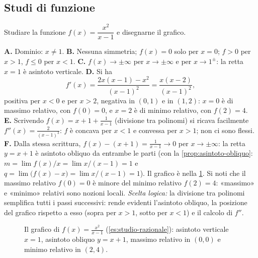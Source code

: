 \subsection*{Studi di funzione}

\begin{esercizio}\label{es:studio-razionale}
Studiare la funzione $f(x)=\dfrac{x^{2}}{x-1}$ e disegnarne il grafico.
\begin{soluzione}
\textbf{A.} Dominio: $x\neq1$. \textbf{B.} Nessuna simmetria; $f(x)=0$ solo per $x=0$;
$f>0$ per $x>1$, $f\le0$ per $x<1$. \textbf{C.} $f(x)\to\pm\infty$ per $x\to\pm\infty$ e
per $x\to1^{\pm}$: la retta $x=1$ è asintoto verticale. \textbf{D.} Si ha
\[
  f'(x)=\frac{2x(x-1)-x^{2}}{(x-1)^{2}}=\frac{x(x-2)}{(x-1)^{2}} ,
\]
positiva per $x<0$ e per $x>2$, negativa in $(0,1)$ e in $(1,2)$: $x=0$ è di massimo
relativo, con $f(0)=0$, e $x=2$ è di minimo relativo, con $f(2)=4$. \textbf{E.}
Scrivendo $f(x)=x+1+\frac1{x-1}$ (divisione tra polinomi) si ricava facilmente
$f''(x)=\frac{2}{(x-1)^{3}}$: $f$ è concava per $x<1$ e convessa per $x>1$; non ci sono
flessi. \textbf{F.} Dalla stessa scrittura, $f(x)-(x+1)=\frac1{x-1}\to0$ per
$x\to\pm\infty$: la retta $y=x+1$ è asintoto obliquo da entrambe le parti (con la
\cref{prop:asintoto-obliquo}: $m=\lim f(x)/x=\lim x/(x-1)=1$ e
$q=\lim\bigl(f(x)-x\bigr)=\lim x/(x-1)=1$). Il grafico è nella
\cref{fig:studio-razionale}. Si noti che il massimo relativo $f(0)=0$ è minore del minimo
relativo $f(2)=4$: «massimo» e «minimo» relativi sono nozioni locali.
\emph{Scelta logica:} la divisione tra polinomi semplifica tutti i passi successivi:
rende evidenti l'asintoto obliquo, la posizione del grafico rispetto a esso (sopra per
$x>1$, sotto per $x<1$) e il calcolo di $f''$.
\end{soluzione}
\end{esercizio}

\begin{figure}[htb]
\centering
{}
\caption{Il grafico di $f(x)=\frac{x^{2}}{x-1}$ (\cref{es:studio-razionale}): asintoto
verticale $x=1$, asintoto obliquo $y=x+1$, massimo relativo in $(0,0)$ e minimo relativo
in $(2,4)$.}
\label{fig:studio-razionale}
\end{figure}

